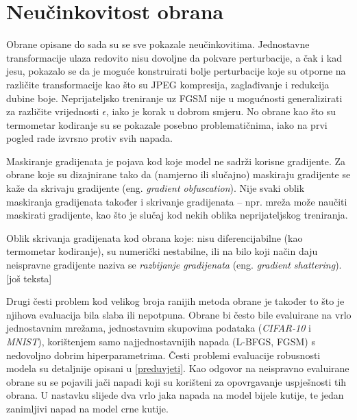 \documentclass[utf8, diplomski]{fer}
\begin{document}
\section{Neučinkovitost obrana}
Obrane opisane do sada su se sve pokazale neučinkovitima. Jednostavne transformacije ulaza redovito nisu dovoljne da pokvare perturbacije, a čak i kad jesu, pokazalo se da je moguće konstruirati bolje perturbacije koje su otporne na različite transformacije kao što su JPEG kompresija, zaglađivanje i redukcija dubine boje. Neprijateljsko treniranje uz FGSM nije u mogućnosti generalizirati za različite vrijednosti $\epsilon$, iako je korak u dobrom smjeru. No obrane kao što su termometar kodiranje su se pokazale posebno problematičnima, iako na prvi pogled rade izvrsno protiv svih napada. \par
Maskiranje gradijenata je pojava kod koje model ne sadrži korisne gradijente. Za obrane koje su dizajnirane tako da (namjerno ili slučajno) maskiraju gradijente se kaže da skrivaju gradijente (eng. \textit{gradient obfuscation})\citep{obfuscated}. Nije svaki oblik maskiranja gradijenata također i skrivanje gradijenata -- npr. mreža može naučiti maskirati gradijente, kao što je slučaj kod nekih oblika neprijateljskog treniranja\citep{ensemble_training}. \par
Oblik skrivanja gradijenata kod obrana koje: nisu diferencijabilne (kao termometar kodiranje), su numerički nestabilne, ili na bilo koji način daju neispravne gradijente naziva se \textit{razbijanje gradijenata} (eng. \textit{gradient shattering})\citep{obfuscated}. [još teksta] \par
Drugi česti problem kod velikog broja ranijih metoda obrane je također to što je njihova evaluacija bila slaba ili nepotpuna. Obrane bi često bile evaluirane na vrlo jednostavnim mrežama, jednostavnim skupovima podataka (\textit{CIFAR-10} i \textit{MNIST}), korištenjem samo najjednostavnijih napada (L-BFGS, FGSM) s nedovoljno dobrim hiperparametrima. Česti problemi evaluacije robusnosti modela su detaljnije opisani u \ref{preduvjeti}. Kao odgovor na neispravno evaluirane obrane su se pojavili jači napadi koji su korišteni za opovrgavanje uspješnosti tih obrana. U nastavku slijede dva vrlo jaka napada na model bijele kutije, te jedan zanimljivi napad na model crne kutije.
\end{document}
